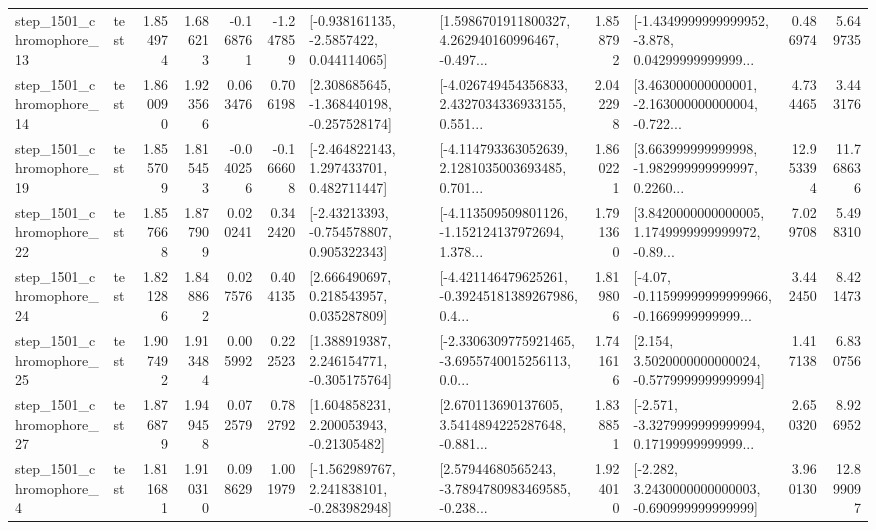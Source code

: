 \begin{tabular}{llrrrrllrlrr}
 step\_1501\_chromophore\_13 &      test &      1.854974 &    1.686213 &     -0.168761 & -1.247859 &     [-0.938161135, -2.5857422, 0.044114065] &  [1.5986701911800327, 4.262940160996467, -0.497... &       1.858792 &  [-1.4349999999999952, -3.878, 0.04299999999999... &            0.486974 &          5.649735 \\
 step\_1501\_chromophore\_14 &      test &      1.860090 &    1.923566 &      0.063476 &  0.706198 &   [2.308685645, -1.368440198, -0.257528174] &  [-4.026749454356833, 2.4327034336933155, 0.551... &       2.042298 &  [3.463000000000001, -2.163000000000004, -0.722... &            4.734465 &          3.443176 \\
 step\_1501\_chromophore\_19 &      test &      1.855709 &    1.815453 &     -0.040256 & -0.166608 &    [-2.464822143, 1.297433701, 0.482711447] &  [-4.114793363052639, 2.1281035003693485, 0.701... &       1.860221 &  [3.663999999999998, -1.982999999999997, 0.2260... &           12.953394 &         11.768636 \\
 step\_1501\_chromophore\_22 &      test &      1.857668 &    1.877909 &      0.020241 &  0.342420 &    [-2.43213393, -0.754578807, 0.905322343] &  [-4.113509509801126, -1.152124137972694, 1.378... &       1.791360 &  [3.8420000000000005, 1.1749999999999972, -0.89... &            7.029708 &          5.498310 \\
 step\_1501\_chromophore\_24 &      test &      1.821286 &    1.848862 &      0.027576 &  0.404135 &     [2.666490697, 0.218543957, 0.035287809] &  [-4.421146479625261, -0.39245181389267986, 0.4... &       1.819806 &  [-4.07, -0.11599999999999966, -0.1669999999999... &            3.442450 &          8.421473 \\
 step\_1501\_chromophore\_25 &      test &      1.907492 &    1.913484 &      0.005992 &  0.222523 &    [1.388919387, 2.246154771, -0.305175764] &  [-2.3306309775921465, -3.6955740015256113, 0.0... &       1.741616 &   [2.154, 3.5020000000000024, -0.5779999999999994] &            1.417138 &          6.830756 \\
 step\_1501\_chromophore\_27 &      test &      1.876879 &    1.949458 &      0.072579 &  0.782792 &     [1.604858231, 2.200053943, -0.21305482] &  [2.670113690137605, 3.5414894225287648, -0.881... &       1.838851 &  [-2.571, -3.3279999999999994, 0.17199999999999... &            2.650320 &          8.926952 \\
  step\_1501\_chromophore\_4 &      test &      1.811681 &    1.910310 &      0.098629 &  1.001979 &   [-1.562989767, 2.241838101, -0.283982948] &  [2.57944680565243, -3.7894780983469585, -0.238... &       1.924010 &   [-2.282, 3.2430000000000003, -0.690999999999999] &            3.960130 &         12.899097 \\

\end{tabular}

